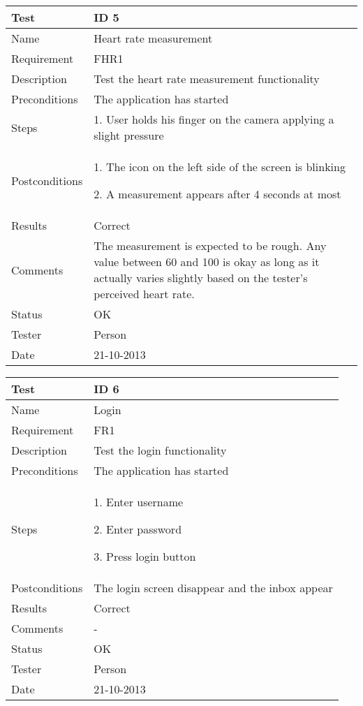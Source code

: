 \begin{table}
\begin{center}
\begin{tabular}{ | l | p{10cm} | }
	\hline
	\textbf{Test}	&	\textbf{ID 5} \\
	\hline\noalign{\smallskip}\noalign{\smallskip}\hline
	Name				& Heart rate measurement \\
	Requirement			& FHR1 \\
	Description			& Test the heart rate measurement functionality \\
	Preconditions		& The application has started \\
	Steps 				&	\par 1. User holds his finger on the camera applying a slight pressure \\
	Postconditions		&	\par 1. The icon on the left side of the screen is blinking 
							\par 2. A measurement appears after 4 seconds at most \\
	Results				& Correct \\
	Comments			&	The measurement is expected to be rough.
							Any value between 60 and 100 is okay as long as it actually varies slightly based
							on the tester's perceived heart rate.  \\
	Status				& OK \\
	Tester				& Person \\
	Date				& 21-10-2013 \\
	\hline
\end{tabular}
\end{center}
\end{table}


\begin{table}
\begin{center}
\begin{tabular}{ | l | p{10cm} | }
	\hline
	\textbf{Test}	&	\textbf{ID 6} \\
	\hline\noalign{\smallskip}\noalign{\smallskip}\hline
	Name				& Login \\
	Requirement			& FR1 \\
	Description			& Test the login functionality \\
	Preconditions		& The application has started \\
	Steps 				&	\par 1. Enter username
							\par 2. Enter password
							\par 3. Press login button \\
	Postconditions		& The login screen disappear and the inbox appear \\
	Results				& Correct \\
	Comments			& - \\
	Status				& OK \\
	Tester				& Person \\
	Date				& 21-10-2013 \\
	\hline
\end{tabular}
\end{center}
\end{table}


